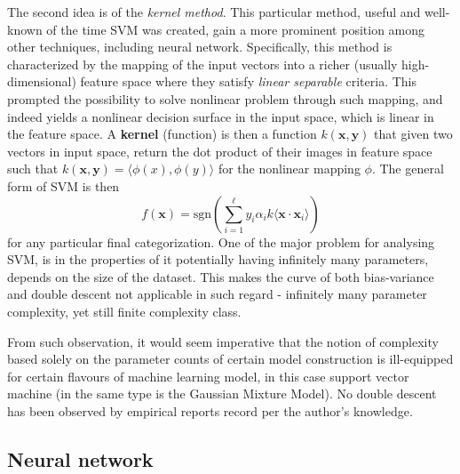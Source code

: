 \documentclass[10pt,oneside,oldfontcommands,dvipsnames,article]{memoir}
\begin{document}
The second idea is of the \textit{kernel method}. This particular method, useful and well-known of the time SVM was created, gain a more prominent position among other techniques, including neural network. Specifically, this method is characterized by the mapping of the input vectors into a richer (usually high-dimensional) feature space where they satisfy \textit{linear separable} criteria. This prompted the possibility to solve nonlinear problem through such mapping, and indeed yields a nonlinear decision surface in the input space, which is linear in the feature space. A \textbf{kernel} (function) is then a function $k(\mathbf{x},\mathbf{y})$ that given two vectors in input space, return the dot product of their images in feature space such that $k(\mathbf{x},\mathbf{y})=\langle \phi(x), \phi(y) \rangle$ for the nonlinear mapping $\phi$. The general form of SVM is then 
\begin{equation}
    f(\mathbf{x}) = \mathrm{sgn} \left(\sum^{\ell}_{i=1} y_{i}\alpha_{i}k\langle \mathbf{x}\cdot \mathbf{x}_{i} \rangle\right)
\end{equation}
for any particular final categorization. One of the major problem for analysing SVM, is in the properties of it potentially having infinitely many parameters, depends on the size of the dataset. This makes the curve of both bias-variance and double descent not applicable in such regard - infinitely many parameter complexity, yet still finite complexity class. 

From such observation, it would seem imperative that the notion of complexity based solely on the parameter counts of certain model construction is ill-equipped for certain flavours of machine learning model, in this case support vector machine (in the same type is the Gaussian Mixture Model). No double descent has been observed by empirical reports record per the author's knowledge. 

\subsection{Neural network}
\end{document}
